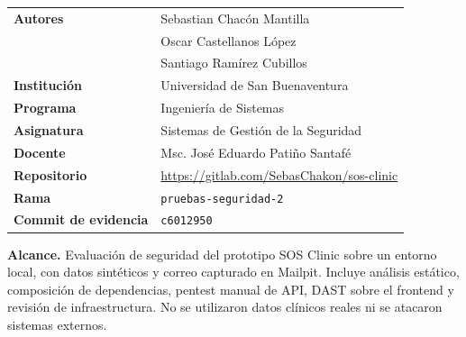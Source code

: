 \documentclass[11pt,a4paper,oneside]{article}
\begin{document}
\begin{titlepage}
\begin{tabular}{@{}L{3.1cm}L{11.2cm}@{}}
\textbf{\color{slate}Autores} & Sebastian Chacón Mantilla\\
 & Oscar Castellanos López\\
 & Santiago Ramírez Cubillos\\
\textbf{\color{slate}Institución} & Universidad de San Buenaventura\\
\textbf{\color{slate}Programa} & Ingeniería de Sistemas\\
\textbf{\color{slate}Asignatura} & Sistemas de Gestión de la Seguridad\\
\textbf{\color{slate}Docente} & Msc. José Eduardo Patiño Santafé\\
\textbf{\color{slate}Repositorio} & \url{https://gitlab.com/SebasChakon/sos-clinic}\\
\textbf{\color{slate}Rama} & \texttt{pruebas-seguridad-2}\\
\textbf{\color{slate}Commit de evidencia} & \texttt{c6012950}\\
\end{tabular}

\vfill

\begin{tcolorbox}[enhanced,colback=teallight,colframe=teal,boxrule=0pt,
  leftrule=3pt,arc=0pt,left=10pt,right=10pt,top=7pt,bottom=7pt]
\small
\textbf{Alcance.} Evaluación de seguridad del prototipo SOS Clinic sobre un entorno
local, con datos sintéticos y correo capturado en Mailpit. Incluye análisis
estático, composición de dependencias, pentest manual de API, DAST sobre el
frontend y revisión de infraestructura. No se utilizaron datos clínicos reales ni
se atacaron sistemas externos.
\end{tcolorbox}

\end{titlepage}

\setcounter{page}{1}

\tableofcontents
\clearpage

\setcounter{page}{1}











\appendix

\end{document}

